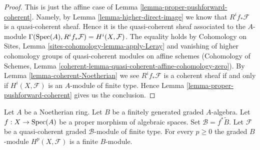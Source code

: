 \begin{proof}
This is just the affine case of Lemma \ref{lemma-proper-pushforward-coherent}.
Namely, by Lemma \ref{lemma-higher-direct-image} we know that
$R^if_*\mathcal{F}$ is a quasi-coherent sheaf. Hence it is the quasi-coherent
sheaf associated to the $A$-module
$\Gamma(\mathop{\mathrm{Spec}}(A), R^if_*\mathcal{F}) = H^i(X, \mathcal{F})$.
The equality holds by
Cohomology on Sites, Lemma \ref{sites-cohomology-lemma-apply-Leray}
and vanishing of higher cohomology groups of quasi-coherent modules
on affine schemes (Cohomology of Schemes, Lemma
\ref{coherent-lemma-quasi-coherent-affine-cohomology-zero}).
By Lemma \ref{lemma-coherent-Noetherian} we see $R^if_*\mathcal{F}$ is
a coherent sheaf if and only if $H^i(X, \mathcal{F})$
is an $A$-module of finite type. Hence
Lemma \ref{lemma-proper-pushforward-coherent} gives us the conclusion.
\end{proof}

\begin{lemma}
\label{lemma-graded-finiteness}
Let $A$ be a Noetherian ring.
Let $B$ be a finitely generated graded $A$-algebra.
Let $f : X \to \mathop{\mathrm{Spec}}(A)$ be a proper morphism of algebraic spaces.
Set $\mathcal{B} = f^*\widetilde B$.
Let $\mathcal{F}$ be a quasi-coherent
graded $\mathcal{B}$-module of finite type.
For every $p \geq 0$ the graded $B$-module $H^p(X, \mathcal{F})$
is a finite $B$-module.
\end{lemma}

